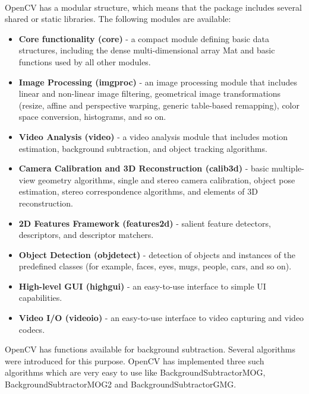 \documentclass[11pt]{report}
\begin{document}
\begin{itemize}
    \\OpenCV has a modular structure, which means that the package includes several shared or static libraries. The following modules are available:
    \begin{itemize}
        \item \textbf{Core functionality (core)} - a compact module defining basic data structures, including the dense multi-dimensional array Mat and basic functions used by all other modules.
        \item \textbf{Image Processing (imgproc)} - an image processing module that includes linear and non-linear image filtering, geometrical image transformations (resize, affine and perspective warping, generic table-based remapping), color space conversion, histograms, and so on.
        \item \textbf{Video Analysis (video)} - a video analysis module that includes motion estimation, background subtraction, and object tracking algorithms.
        \item \textbf{Camera Calibration and 3D Reconstruction (calib3d)} - basic multiple-view geometry algorithms, single and stereo camera calibration, object pose estimation, stereo correspondence algorithms, and elements of 3D reconstruction.
        \item \textbf{2D Features Framework (features2d)} - salient feature detectors, descriptors, and descriptor matchers.
        \item \textbf{Object Detection (objdetect)} - detection of objects and instances of the predefined classes (for example, faces, eyes, mugs, people, cars, and so on).
        \item \textbf{High-level GUI (highgui)} - an easy-to-use interface to simple UI capabilities.
        \item \textbf{Video I/O (videoio)} - an easy-to-use interface to video capturing and video codecs.
    \end{itemize}


    OpenCV has functions available for background subtraction. Several algorithms were introduced for this purpose. OpenCV has implemented three such algorithms which are very easy to use like BackgroundSubtractorMOG, BackgroundSubtractorMOG2 and BackgroundSubtractorGMG.
    

\end{itemize}
\end{document}
